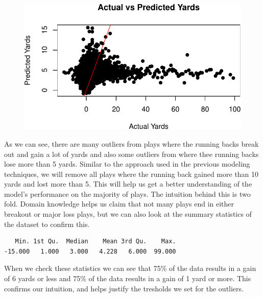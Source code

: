 \documentclass[
  super,
  preprint,
  3p]{elsarticle}
\newenvironment{Shaded}{\begin{snugshade}}{\end{snugshade}}
\newcommand{\FunctionTok}[1]{\textcolor[rgb]{0.28,0.35,0.67}{#1}}
\newcommand{\NormalTok}[1]{\textcolor[rgb]{0.00,0.23,0.31}{#1}}
\newcommand{\SpecialCharTok}[1]{\textcolor[rgb]{0.37,0.37,0.37}{#1}}
\begin{document}
\begin{figure}[H]

{\centering \includegraphics{project_report_files/figure-pdf/unnamed-chunk-9-1.pdf}

}

\end{figure}

As we can see, there are many outliers from plays where the running
backs break out and gain a lot of yards and also some outliers from
where thee running backs lose more than 5 yards. Similar to the approach
used in the previous modeling techniques, we will remove all plays where
the running back gained more than 10 yards and lost more than 5. This
will help us get a better understanding of the model's performance on
the majority of plays. The intuition behind this is two fold. Domain
knowledge helps us claim that not many plays end in either breakout or
major loss plays, but we can also look at the summary statistics of the
dataset to confirm this.

\begin{Shaded}
\end{Shaded}

\begin{verbatim}
   Min. 1st Qu.  Median    Mean 3rd Qu.    Max. 
-15.000   1.000   3.000   4.228   6.000  99.000 
\end{verbatim}

When we check these statistics we can see that 75\% of the data results
in a gain of 6 yards or less and 75\% of the data results in a gain of 1
yard or more. This confirms our intuition, and helps justify the
tresholds we set for the outliers.
\end{document}
